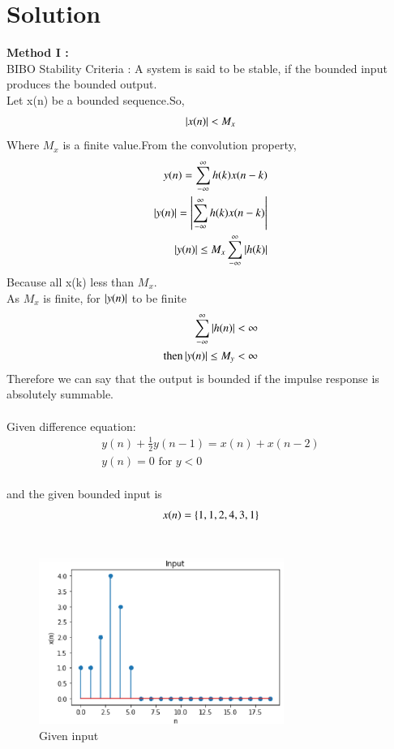 \documentclass[journal,12pt,twocolumn]{IEEEtran}
\begin{document}
\section{Solution}
\textbf{Method I :}
\\
BIBO Stability Criteria : A system is said to be stable, if the bounded input produces the bounded output.\\
Let x(n) be a bounded sequence.So, 
\begin{align}
\left\vert x(n)\right\vert<M_x
\end{align}
Where $M_x$ is a finite value.From the convolution property,
\begin{align}
 y(n)= \sum_{-\infty}^{\infty}h(k)x(n-k)\\
 \left\vert y(n)\right\vert= \left\vert\sum_{-\infty}^{\infty}h(k)x(n-k)\right\vert\\
 \left\vert y(n)\right\vert \leq M_x\sum_{-\infty}^{\infty}\left\vert h(k)\right\vert 
\end{align}
Because all x(k) less than $M_x$.\\
As $M_x$ is finite, for $\left\vert y(n)\right\vert$ to be finite
\begin{align}
\sum_{-\infty}^{\infty}\left\vert h(n)\right\vert < 
\infty \\
\text{then} \left\vert y(n)\right\vert \leq M_y < \infty 
\end{align}
Therefore we can say that the output is bounded if the impulse response is absolutely summable.\\
\\
Given difference equation: 
\begin{align}
y(n)+\frac{1}{2}y(n-1) = x(n)+x(n-2) \\
y(n)=0 \text{ for }y<0
\end{align}\\
and the given bounded input is \\
\begin{align}
x(n) = \left\{1,1,2,4,3,1\right\}
\end{align} \\
\begin{figure}[h!]
    \centering
    \includegraphics[width=8cm]{./figures/INPUT.eps}
    \caption{Given input}
    \label{xn}
\end{figure}\\
\end{document}
